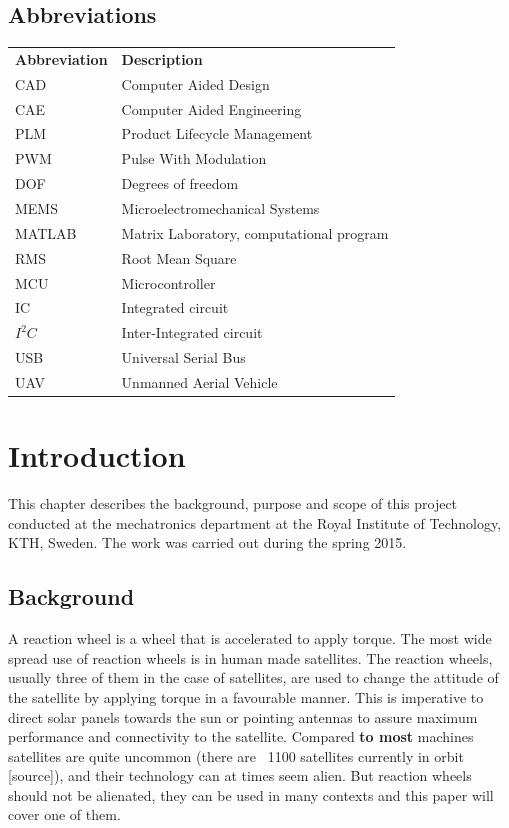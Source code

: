\documentclass[a4paper,11pt]{kth-mag}
\begin{document}
\section*{Abbreviations}
\noindent{}\begin{tabular}{@{}p{2.5cm}l}
\textbf{Abbreviation} 	& \textbf{Description} \vspace{.5em} \\
CAD			& Computer Aided Design \\
CAE			& Computer Aided Engineering\\
PLM			& Product Lifecycle Management\\
PWM			& Pulse With Modulation\\
DOF			& Degrees of freedom\\
MEMS			& Microelectromechanical Systems \\
MATLAB		& Matrix Laboratory, computational program\\
RMS			& Root Mean Square\\
MCU			& Microcontroller\\
IC			& Integrated circuit\\
$I^2C$		& Inter-Integrated circuit\\
USB			& Universal Serial Bus \\
UAV			& Unmanned Aerial Vehicle\\
\end{tabular}
\cleardoublepage

\mainmatter
\pagestyle{newchap}

\chapter{Introduction}
This chapter describes the background, purpose and scope of this project conducted at the mechatronics department at the Royal Institute of Technology, KTH, Sweden. The work was carried out during the spring 2015.

\section{Background}
A reaction wheel is a wheel that is accelerated to apply torque. The most wide spread use of reaction wheels is in human made satellites. The  reaction wheels, usually three of them in the case of satellites, are used to change the attitude of the satellite by applying torque in a favourable manner. This is imperative to direct solar panels towards the sun or pointing antennas to assure maximum performance and connectivity to the satellite. Compared \textbf{to most} machines satellites are quite uncommon (there are ~1100 satellites currently in orbit [source]), and their technology can at times seem alien. But reaction wheels should not be alienated, they can be used in many contexts and this paper will cover one of them.  
\end{document}
